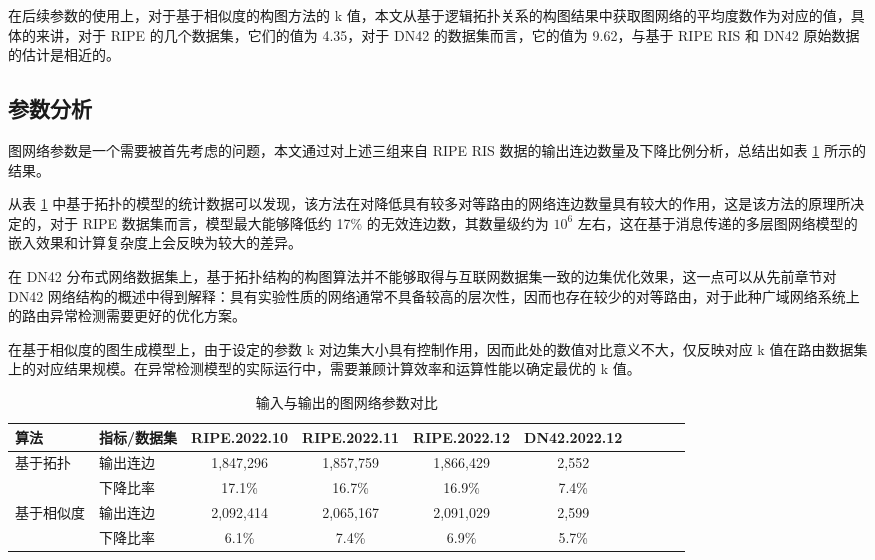 在后续参数的使用上，对于基于相似度的构图方法的 k 值，本文从基于逻辑拓扑关系的构图结果中获取图网络的平均度数作为对应的值，具体的来讲，对于 RIPE 的几个数据集，它们的值为 4.35，对于 DN42 的数据集而言，它的值为 9.62，与基于 RIPE RIS 和 DN42 原始数据的估计是相近的。


\subsection{参数分析}

图网络参数是一个需要被首先考虑的问题，本文通过对上述三组来自 RIPE RIS 数据的输出连边数量及下降比例分析，总结出如表 \ref{c3_data_arg} 所示的结果。

从表 \ref{c3_data_arg} 中基于拓扑的模型的统计数据可以发现，该方法在对降低具有较多对等路由的网络连边数量具有较大的作用，这是该方法的原理所决定的，对于 RIPE 数据集而言，模型最大能够降低约 17\% 的无效连边数，其数量级约为 $10^6$ 左右，这在基于消息传递的多层图网络模型的嵌入效果和计算复杂度上会反映为较大的差异。

在 DN42 分布式网络数据集上，基于拓扑结构的构图算法并不能够取得与互联网数据集一致的边集优化效果，这一点可以从先前章节对 DN42 网络结构的概述中得到解释：具有实验性质的网络通常不具备较高的层次性，因而也存在较少的对等路由，对于此种广域网络系统上的路由异常检测需要更好的优化方案。

在基于相似度的图生成模型上，由于设定的参数 k 对边集大小具有控制作用，因而此处的数值对比意义不大，仅反映对应 k 值在路由数据集上的对应结果规模。在异常检测模型的实际运行中，需要兼顾计算效率和运算性能以确定最优的 k 值。

\begin{table}
    \caption{输入与输出的图网络参数对比}
    \begin{tabular}{llcccccccc}
        \toprule
        算法                     & 指标/数据集 & RIPE.2022.10 & RIPE.2022.11 & RIPE.2022.12 & DN42.2022.12 \\
        \midrule
        \multirow{2}{*}{基于拓扑}  & 输出连边 & 1,847,296    & 1,857,759    & 1,866,429    & 2,552        \\
                               & 下降比率   & 17.1\%       & 16.7\%       & 16.9\%       & 7.4\%        \\
        \midrule
        \multirow{2}{*}{基于相似度} & 输出连边 & 2,092,414    & 2,065,167    & 2,091,029    & 2,599        \\
                               & 下降比率   & 6.1\%        & 7.4\%        & 6.9\%        & 5.7\%        \\
        \bottomrule
    \end{tabular}
    \label{c3_data_arg}
\end{table}

